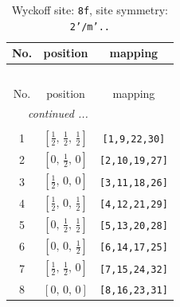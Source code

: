 \documentclass[fleqn,8pt]{jsarticle}
\begin{document}
\begin{longtable}{ccc}
\caption{Wyckoff site: {\tt 8f}, site symmetry: {\tt 2'/m'..}}
 \\
 \hline \hline
No. & position & mapping \\ \hline \endfirsthead

\multicolumn{2}{l}{\tablename\ \thetable{}} \\
 \hline \hline
No. & position & mapping \\ \hline \endhead

 \hline \hline
\multicolumn{2}{r}{\footnotesize\it continued ...} \\ \endfoot

 \hline \hline
\multicolumn{2}{r}{} \\ \endlastfoot

1 & $\left[ \frac{1}{2},\, \frac{1}{2},\, \frac{1}{2} \right]$ & {\tt [1,9,22,30]} \\ \hline
2 & $\left[ 0,\, \frac{1}{2},\, 0 \right]$ & {\tt [2,10,19,27]} \\ \hline
3 & $\left[ \frac{1}{2},\, 0,\, 0 \right]$ & {\tt [3,11,18,26]} \\ \hline
4 & $\left[ \frac{1}{2},\, 0,\, \frac{1}{2} \right]$ & {\tt [4,12,21,29]} \\ \hline
5 & $\left[ 0,\, \frac{1}{2},\, \frac{1}{2} \right]$ & {\tt [5,13,20,28]} \\ \hline
6 & $\left[ 0,\, 0,\, \frac{1}{2} \right]$ & {\tt [6,14,17,25]} \\ \hline
7 & $\left[ \frac{1}{2},\, \frac{1}{2},\, 0 \right]$ & {\tt [7,15,24,32]} \\ \hline
8 & $\left[ 0,\, 0,\, 0 \right]$ & {\tt [8,16,23,31]} \\
\end{longtable}
\renewcommand{\arraystretch}{1.2}
\end{document}

